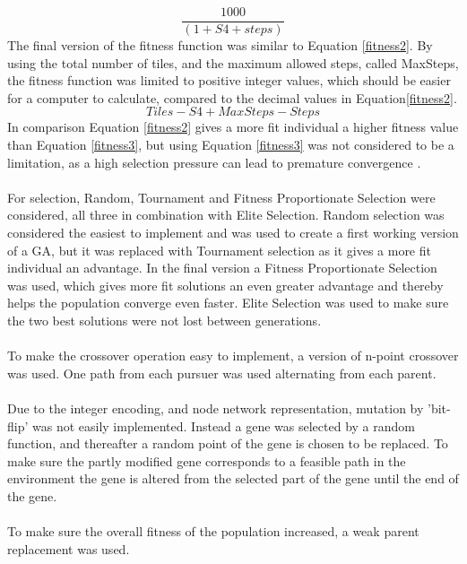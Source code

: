 %
\begin{equation}\label{fitness2} \frac{1000}{(1+S4+steps)} \end{equation}
%
The final version of the fitness function was similar to Equation \eqref{fitness2}. By using the total number of tiles, and the maximum allowed steps, called MaxSteps, the fitness function was limited to positive integer values, which should be easier for a computer to calculate, compared to the decimal values in Equation\eqref{fitness2}.
%
\begin{equation} \label{fitness3}Tiles-S4+MaxSteps-Steps \end{equation}
%
In comparison Equation \eqref{fitness2} gives a more fit individual a higher fitness value than Equation \eqref{fitness3}, but using Equation \eqref{fitness3} was not considered to be a limitation, as a high selection pressure can lead to premature convergence \cite{GAHandbook1}.\\\\
For selection, Random, Tournament  and Fitness Proportionate Selection were considered, all three in combination with Elite Selection. Random selection was considered the easiest to implement and was used to create a first working version of a GA, but it was replaced with Tournament selection as it gives a more fit individual an advantage. In the final version a Fitness Proportionate Selection was used, which gives more fit solutions an even greater advantage and thereby helps the population converge even faster. Elite Selection was used to make sure the two best solutions were not lost between generations.\\\\
To make the crossover operation easy to implement, a version of n-point crossover was used. One path from each pursuer was used alternating from each parent.\\\\
Due to the integer encoding, and node network representation, mutation by 'bit-flip' was not easily implemented. Instead a gene was selected by a random function, and thereafter a random point of the gene is chosen to be replaced. To make sure the partly modified gene corresponds to a feasible path in the environment the gene is altered from the selected part of the gene until the end of the gene.\\\\
To make sure the overall fitness of the population increased, a weak parent replacement was used.\\\\
